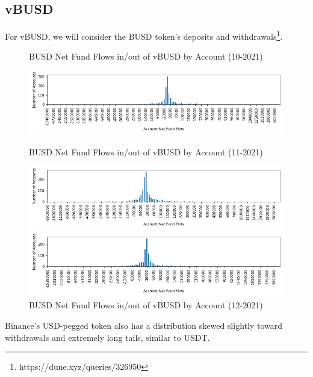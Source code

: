 \documentclass[12pt]{article}
\begin{document}
        \subsection*{vBUSD}
            For vBUSD, we will consider the BUSD token's deposits and withdrawals\footnote{https://dune.xyz/queries/326950}.
            \begin{figure}[h]
                \caption{BUSD Net Fund Flows in/out of vBUSD by Account (10-2021) \label{overflow}}
                \centering
                \hspace*{-1in}
                \includegraphics[width=0.8\paperwidth]{net-fundflow-accountdist-vBUSD-10-2021.png}

                \caption{BUSD Net Fund Flows in/out of vBUSD by Account (11-2021) \label{overflow}}
                \centering
                \hspace*{-1in}
                \includegraphics[width=0.8\paperwidth]{net-fundflow-accountdist-vBUSD-11-2021.png}

                \caption{BUSD Net Fund Flows in/out of vBUSD by Account (12-2021) \label{overflow}}
                \centering
                \hspace*{-1in}
                \includegraphics[width=0.8\paperwidth]{net-fundflow-accountdist-vBUSD-12-2021.png}
            \end{figure}

            Binance's USD-pegged token also has a distribution skewed slightly toward withdrawals and extremely long tails, similar to USDT.
            \clearpage
\end{document}
